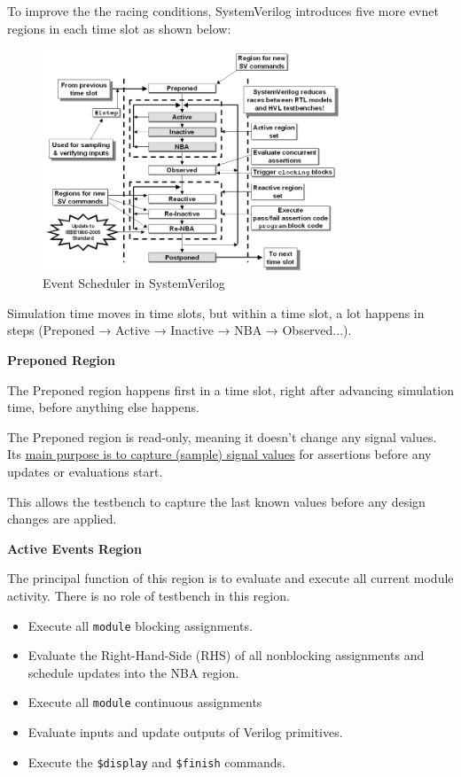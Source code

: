 \documentclass[12pt, a4paper]{article}
\begin{document}
To improve the the racing conditions, SystemVerilog introduces five more evnet regions in each time slot as shown below:

\begin{figure}[H]
    \centering
    \includegraphics[width=0.8\textwidth]{SystemVerilog_Event_Scheduler.png}
    \caption{Event Scheduler in SystemVerilog}
    \label{fig:event_scheduler_sv}
\end{figure}

Simulation time moves in time slots, but within a time slot, a lot happens in steps (Preponed → Active → Inactive → NBA → Observed...).

\vspace{0.5em}

\textbf{Preponed Region}

The Preponed region happens first in a time slot, right after advancing simulation time, before anything else happens.

The Preponed region is read-only, meaning it doesn't change any signal values. Its \ul{main purpose is to capture (sample) signal values} for assertions before any updates or evaluations start.

This allows the testbench to capture the last known values before any design changes are applied.

\vspace{0.5em}

\textbf{Active Events Region}

The principal function of this region is to evaluate and execute all current module activity. There is no role of testbench in this region.
 
\begin{itemize}[nosep]
    \item Execute all \texttt{module} blocking assignments.
    \item Evaluate the Right-Hand-Side (RHS) of all nonblocking assignments and schedule updates into the NBA region.
    \item Execute all \texttt{module} continuous assignments
    \item Evaluate inputs and update outputs of Verilog primitives.
    \item Execute the \texttt{\$display} and \texttt{\$finish} commands.
\end{itemize}
\end{document}
